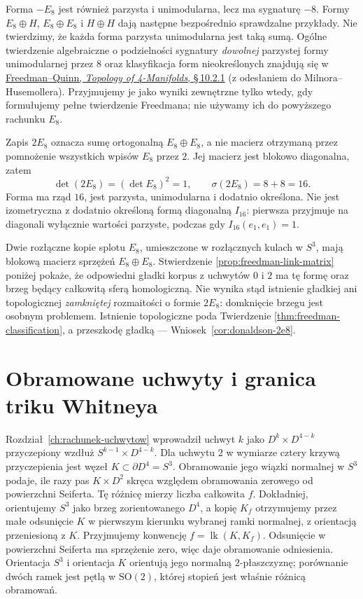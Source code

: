 Forma $-E_8$ jest również parzysta i unimodularna,
lecz ma sygnaturę $-8$. Formy $E_8\oplus H$,
$E_8\oplus E_8$ i $H\oplus H$ dają następne
bezpośrednio sprawdzalne przykłady. Nie twierdzimy,
że każda forma parzysta unimodularna jest taką sumą.
Ogólne twierdzenie algebraiczne o podzielności
sygnatury \emph{dowolnej} parzystej formy unimodularnej
przez $8$ oraz klasyfikacja form nieokreślonych
znajdują się w \href{https://archive.mpim-bonn.mpg.de/4789/2/FreedmanQuinn-TopologyOf4Manifolds-Reformatted2013.pdf}
{Freedman--Quinn, \emph{Topology of 4-Manifolds},
\S\,10.2.1} (z odesłaniem do Milnora--Husemollera).
Przyjmujemy je jako wyniki zewnętrzne tylko wtedy,
gdy formułujemy pełne twierdzenie Freedmana;
nie używamy ich do powyższego rachunku $E_8$.

\begin{przyklad}[Forma $2E_8$]
\label{prz:freedman-2E8}
Zapis $2E_8$ oznacza sumę ortogonalną
$E_8\oplus E_8$, a nie macierz otrzymaną przez
pomnożenie wszystkich wpisów $E_8$ przez $2$.
Jej macierz jest blokowo diagonalna, zatem
\[
 \det(2E_8)=(\det E_8)^2=1,
 \qquad \sigma(2E_8)=8+8=16.
\]
Forma ma rząd $16$, jest parzysta, unimodularna
i dodatnio określona. Nie jest izometryczna z dodatnio
określoną formą diagonalną $I_{16}$: pierwsza przyjmuje
na diagonali wyłącznie wartości parzyste, podczas gdy
$I_{16}(e_1,e_1)=1$.

Dwie rozłączne kopie splotu $E_8$, umieszczone
w rozłącznych kulach w $S^3$, mają blokową macierz
sprzężeń $E_8\oplus E_8$. Stwierdzenie
\ref{prop:freedman-link-matrix} poniżej pokaże, że
odpowiedni gładki korpus z uchwytów $0$ i $2$ ma tę
formę oraz brzeg będący całkowitą sferą homologiczną.
Nie wynika stąd istnienie gładkiej ani topologicznej
\emph{zamkniętej} rozmaitości o formie $2E_8$:
domknięcie brzegu jest osobnym problemem. Istnienie
topologiczne poda Twierdzenie
\ref{thm:freedman-classification}, a przeszkodę gładką
--- Wniosek~\ref{cor:donaldson-2e8}.
\end{przyklad}

\section{Obramowane uchwyty i granica triku Whitneya}
\label{sec:freedman-handles}

Rozdział~\ref{ch:rachunek-uchwytow} wprowadził uchwyt
$k$ jako $D^k\times D^{4-k}$ przyczepiony wzdłuż
$S^{k-1}\times D^{4-k}$. Dla uchwytu $2$ w wymiarze
cztery krzywą przyczepienia jest węzeł
$K\subset\partial D^4=S^3$. Obramowanie jego wiązki
normalnej w $S^3$ podaje, ile razy pas $K\times D^2$
skręca względem obramowania zerowego od powierzchni
Seiferta. Tę różnicę mierzy liczba całkowita $f$.
Dokładniej, orientujemy $S^3$ jako brzeg zorientowanego
$D^4$, a kopię $K_f$ otrzymujemy przez małe odsunięcie
$K$ w pierwszym kierunku wybranej ramki normalnej,
z orientacją przeniesioną z $K$.
Przyjmujemy konwencję $f=\operatorname{lk}(K,K_f)$.
Odsunięcie w powierzchni Seiferta ma sprzężenie zero,
więc daje obramowanie odniesienia. Orientacja $S^3$
i orientacja $K$ orientują jego normalną $2$-płaszczyznę;
porównanie dwóch ramek jest pętlą w $\mathrm{SO}(2)$,
której stopień jest właśnie różnicą obramowań.

